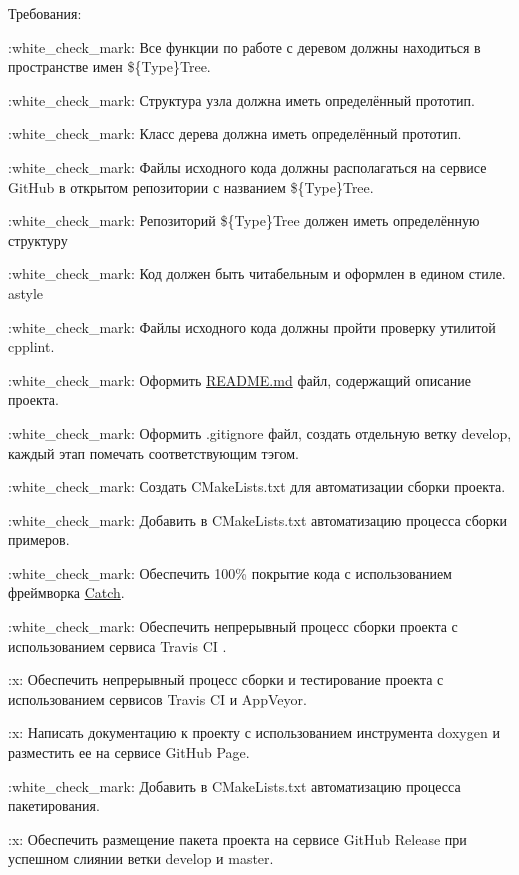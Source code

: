 Требования\+:
\begin{DoxyEnumerate}
\item \+:white\+\_\+check\+\_\+mark\+: Все функции по работе с деревом должны находиться в пространстве имен \$\{Type\}Tree.
\item \+:white\+\_\+check\+\_\+mark\+: Структура узла должна иметь определённый прототип.
\item \+:white\+\_\+check\+\_\+mark\+: Класс дерева должна иметь определённый прототип.
\item \+:white\+\_\+check\+\_\+mark\+: Файлы исходного кода должны располагаться на сервисе Git\+Hub в открытом репозитории с названием \$\{Type\}Tree.
\item \+:white\+\_\+check\+\_\+mark\+: Репозиторий \$\{Type\}Tree должен иметь определённую структуру
\item \+:white\+\_\+check\+\_\+mark\+: Код должен быть читабельным и оформлен в едином стиле. astyle
\item \+:white\+\_\+check\+\_\+mark\+: Файлы исходного кода должны пройти проверку утилитой cpplint.
\item \+:white\+\_\+check\+\_\+mark\+: Оформить \mbox{\hyperlink{_r_e_a_d_m_e_8md}{R\+E\+A\+D\+M\+E.\+md}} файл, содержащий описание проекта.
\item \+:white\+\_\+check\+\_\+mark\+: Оформить .gitignore файл, создать отдельную ветку develop, каждый этап помечать соответствующим тэгом.
\item \+:white\+\_\+check\+\_\+mark\+: Создать C\+Make\+Lists.\+txt для автоматизации сборки проекта.
\item \+:white\+\_\+check\+\_\+mark\+: Добавить в C\+Make\+Lists.\+txt автоматизацию процесса сборки примеров.
\item \+:white\+\_\+check\+\_\+mark\+: Обеспечить 100\% покрытие кода с использованием фреймворка \mbox{\hyperlink{namespace_catch}{Catch}}.
\item \+:white\+\_\+check\+\_\+mark\+: Обеспечить непрерывный процесс сборки проекта с использованием сервиса Travis CI .
\item \+:x\+: Обеспечить непрерывный процесс сборки и тестирование проекта с использованием сервисов Travis CI и App\+Veyor.
\item \+:x\+: Написать документацию к проекту с использованием инструмента doxygen и разместить ее на сервисе Git\+Hub Page.
\item \+:white\+\_\+check\+\_\+mark\+: Добавить в C\+Make\+Lists.\+txt автоматизацию процесса пакетирования.
\item \+:x\+: Обеспечить размещение пакета проекта на сервисе Git\+Hub Release при успешном слиянии ветки develop и master.
\end{DoxyEnumerate}


 
